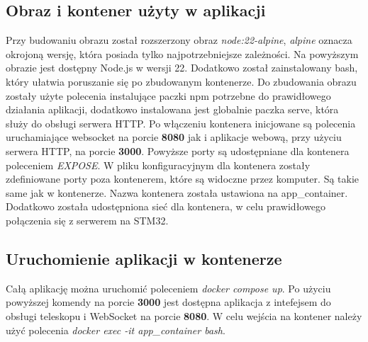 \subsection{Obraz i kontener użyty w aplikacji}
Przy budowaniu obrazu został rozszerzony obraz \textit{node:22-alpine}, \textit{alpine} oznacza okrojoną wersję, która posiada tylko najpotrzebniejsze zależności. Na powyższym obrazie jest dostępny Node.js w wersji 22. Dodatkowo został zainstalowany bash, który ułatwia poruszanie się po zbudowanym kontenerze. Do zbudowania obrazu zostały użyte polecenia instalujące paczki npm potrzebne do prawidłowego działania aplikacji, dodatkowo instalowana jest globalnie paczka serve, która służy do obsługi serwera HTTP. Po włączeniu kontenera inicjowane są polecenia uruchamiające websocket na porcie \textbf{8080} jak i aplikacje webową, przy użyciu serwera HTTP, na porcie \textbf{3000}. Powyższe porty są udostępniane dla kontenera poleceniem \textit{EXPOSE}. W pliku konfiguracyjnym dla kontenera zostały zdefiniowane porty poza kontenerem, które są widoczne przez komputer. Są takie same jak w kontenerze. Nazwa kontenera została ustawiona na app\_container. Dodatkowo została udostępniona sieć dla kontenera, w celu prawidłowego połączenia się z serwerem na STM32.
\subsection{Uruchomienie aplikacji w kontenerze}
Całą aplikację można uruchomić poleceniem \textit{docker compose up}. Po użyciu powyższej komendy na porcie \textbf{3000} jest dostępna aplikacja z intefejsem do obsługi teleskopu i WebSocket na porcie \textbf{8080}. W celu wejścia na kontener należy użyć polecenia \textit{docker exec -it app\_container bash}.